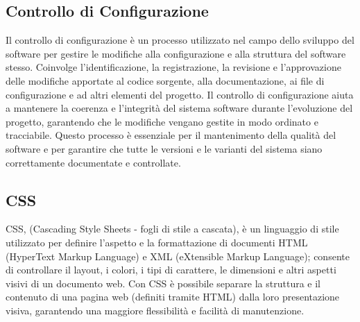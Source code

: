 \subsection*{Controllo di Configurazione} 
Il controllo di configurazione è un processo utilizzato nel campo dello sviluppo del software per gestire le modifiche alla configurazione e alla struttura del software stesso. Coinvolge l'identificazione, la registrazione, la revisione e l'approvazione delle modifiche apportate al codice sorgente, alla documentazione, ai file di configurazione e ad altri elementi del progetto. Il controllo di configurazione aiuta a mantenere la coerenza e l'integrità del sistema software durante l'evoluzione del progetto, garantendo che le modifiche vengano gestite in modo ordinato e tracciabile. Questo processo è essenziale per il mantenimento della qualità del software e per garantire che tutte le versioni e le varianti del sistema siano correttamente documentate e controllate.
\subsection*{CSS} 
CSS, (Cascading Style Sheets - fogli di stile a cascata), è un linguaggio di stile utilizzato per definire l'aspetto e la formattazione di documenti HTML (HyperText Markup Language) e XML (eXtensible Markup Language); consente di controllare il layout, i colori, i tipi di carattere, le dimensioni e altri aspetti visivi di un documento web. Con CSS è possibile separare la struttura e il contenuto di una pagina web (definiti tramite HTML) dalla loro presentazione visiva, garantendo una maggiore flessibilità e facilità di manutenzione.
